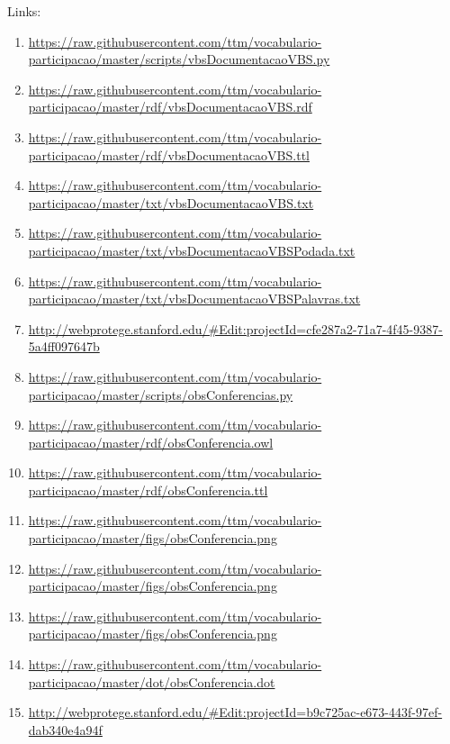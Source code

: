 \documentclass[12pt]{article}
\begin{document}
Links:
{\scriptsize
\begin{enumerate}
    \item \url{https://raw.githubusercontent.com/ttm/vocabulario-participacao/master/scripts/vbsDocumentacaoVBS.py}\label{i:1}
    \item \url{https://raw.githubusercontent.com/ttm/vocabulario-participacao/master/rdf/vbsDocumentacaoVBS.rdf}\label{i:2}
    \item \url{https://raw.githubusercontent.com/ttm/vocabulario-participacao/master/rdf/vbsDocumentacaoVBS.ttl}\label{i:3}
    \item \url{https://raw.githubusercontent.com/ttm/vocabulario-participacao/master/txt/vbsDocumentacaoVBS.txt} \label{i:4}
    \item \url{https://raw.githubusercontent.com/ttm/vocabulario-participacao/master/txt/vbsDocumentacaoVBSPodada.txt}\label{i:4_1}
    \item \url{https://raw.githubusercontent.com/ttm/vocabulario-participacao/master/txt/vbsDocumentacaoVBSPalavras.txt}\label{i:5}
    \item \url{http://webprotege.stanford.edu/#Edit:projectId=cfe287a2-71a7-4f45-9387-5a4ff097647b}\label{i:5wp}

    \item \url{https://raw.githubusercontent.com/ttm/vocabulario-participacao/master/scripts/obsConferencias.py}\label{i:6}
    \item \url{https://raw.githubusercontent.com/ttm/vocabulario-participacao/master/rdf/obsConferencia.owl}\label{i:7}
    \item \url{https://raw.githubusercontent.com/ttm/vocabulario-participacao/master/rdf/obsConferencia.ttl}\label{i:8}
    \item \url{https://raw.githubusercontent.com/ttm/vocabulario-participacao/master/figs/obsConferencia.png}\label{i:9}
    \item \url{https://raw.githubusercontent.com/ttm/vocabulario-participacao/master/figs/obsConferencia.png}\label{i:10}
    \item \url{https://raw.githubusercontent.com/ttm/vocabulario-participacao/master/figs/obsConferencia.png}\label{i:11}
    \item \url{https://raw.githubusercontent.com/ttm/vocabulario-participacao/master/dot/obsConferencia.dot}\label{i:11_1}
    \item \url{http://webprotege.stanford.edu/#Edit:projectId=b9c725ac-e673-443f-97ef-dab340e4a94f}\label{i:11wp}


\end{enumerate}}
\end{document}
